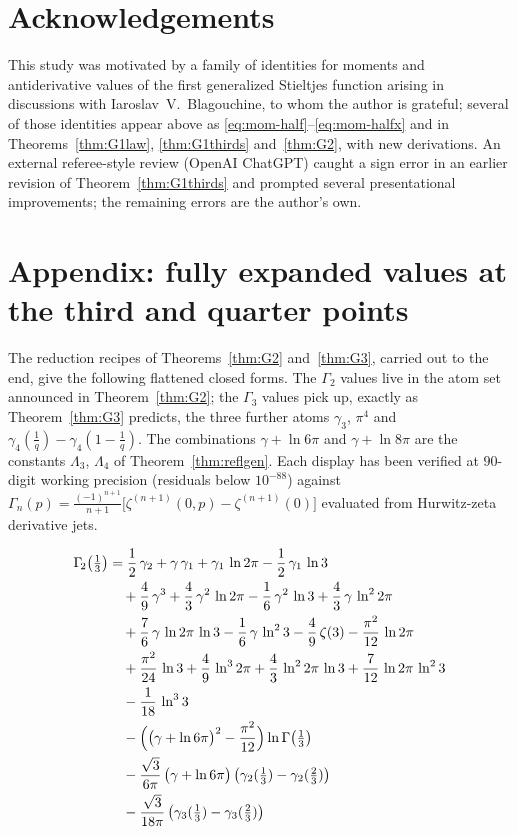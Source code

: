 \documentclass[11pt]{article}
\theoremstyle{remark}
\begin{document}
\section*{Acknowledgements}

This study was motivated by a family of identities for moments and
antiderivative values of the first generalized Stieltjes function arising
in discussions with Iaroslav~V.~Blagouchine, to whom the author is
grateful; several of those identities appear above as
\eqref{eq:mom-half}--\eqref{eq:mom-halfx} and in
Theorems~\ref{thm:G1law}, \ref{thm:G1thirds} and~\ref{thm:G2}, with new
derivations. An external referee-style review (OpenAI ChatGPT) caught a
sign error in an earlier revision of Theorem~\ref{thm:G1thirds} and
prompted several presentational improvements; the remaining errors are
the author's own.

\section*{Appendix: fully expanded values at the third and quarter points}

The reduction recipes of Theorems~\ref{thm:G2} and~\ref{thm:G3}, carried out
to the end, give the following flattened closed forms. The $\Gamma_{\!2}$
values live in the atom set announced in Theorem~\ref{thm:G2}; the
$\Gamma_{\!3}$ values pick up, exactly as Theorem~\ref{thm:G3} predicts, the
three further atoms $\gamma_3$, $\pi^4$ and
$\gamma_{4}(\tfrac1q)-\gamma_{4}(1-\tfrac1q)$. The combinations
$\gamma+\ln 6\pi$ and $\gamma+\ln 8\pi$ are the constants $\Lambda_3$, $\Lambda_4$ of
Theorem~\ref{thm:reflgen}. Each display has been verified at $90$-digit
working precision (residuals below $10^{-88}$) against
$\Gamma_{\!n}(p)=\frac{(-1)^{n+1}}{n+1}\bigl[\zeta^{(n+1)}(0,p)-\zeta^{(n+1)}(0)\bigr]$
evaluated from Hurwitz-zeta derivative jets.

\begin{align*}
\Gamma_{\!2}\bigl(\tfrac13\bigr) &= \frac{1}{2}\,\gamma_{2}+\gamma\,\gamma_{1}+\gamma_{1}\,\ln 2\pi-\frac{1}{2}\,\gamma_{1}\,\ln 3 \\
 &\quad +\frac{4}{9}\,\gamma^{3}+\frac{4}{3}\,\gamma^{2}\,\ln 2\pi-\frac{1}{6}\,\gamma^{2}\,\ln 3+\frac{4}{3}\,\gamma\,\ln^{2} 2\pi \\
 &\quad +\frac{7}{6}\,\gamma\,\ln 2\pi\,\ln 3-\frac{1}{6}\,\gamma\,\ln^{2} 3-\frac{4}{9}\,\zeta(3)-\frac{\pi^{2}}{12}\,\ln 2\pi \\
 &\quad +\frac{\pi^{2}}{24}\,\ln 3+\frac{4}{9}\,\ln^{3} 2\pi+\frac{4}{3}\,\ln^{2} 2\pi\,\ln 3+\frac{7}{12}\,\ln 2\pi\,\ln^{2} 3 \\
 &\quad -\frac{1}{18}\,\ln^{3} 3 \\
 &\quad -\Bigl(\bigl(\gamma+\ln 6\pi\bigr)^{2}-\frac{\pi^{2}}{12}\Bigr)\ln\Gamma\bigl(\tfrac13\bigr) \\
 &\quad -\frac{\sqrt{3}}{6\pi}\,\bigl(\gamma+\ln 6\pi\bigr)\,\bigl(\gamma_{2}(\tfrac13)-\gamma_{2}(\tfrac23)\bigr) \\
 &\quad -\frac{\sqrt{3}}{18\pi}\,\bigl(\gamma_{3}(\tfrac13)-\gamma_{3}(\tfrac23)\bigr)
\end{align*}
\end{document}

